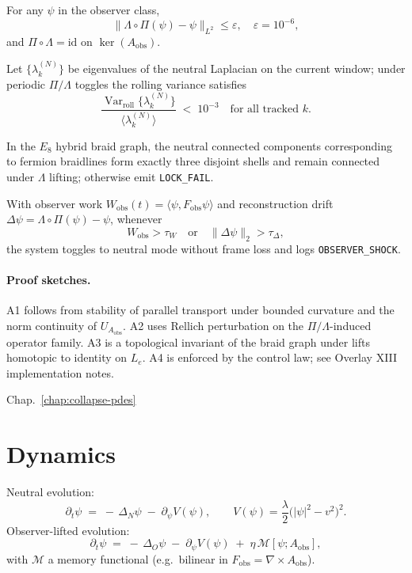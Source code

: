 \begin{prop}[A1: Idempotence]
For any $\psi$ in the observer class,
\[
\|\Lambda\!\circ\!\Pi(\psi)-\psi\|_{L^2}\le \varepsilon,\quad \varepsilon=10^{-6},
\]
and $\Pi\!\circ\!\Lambda=\mathrm{id}$ on $\ker(A_{\mathrm{obs}})$.
\end{prop}

\begin{prop}
Let $\{\lambda_k^{(N)}\}$ be eigenvalues of the neutral Laplacian on the current window; under periodic $\Pi/\Lambda$ toggles the rolling variance satisfies
\[
\frac{\operatorname{Var}_{\mathrm{roll}}\{\lambda_k^{(N)}\}}{\langle\lambda_k^{(N)}\rangle}\;<\;10^{-3}\quad \text{for all tracked }k.
\]
\end{prop}

\begin{prop}
In the $E_8$ hybrid braid graph, the neutral connected components corresponding to fermion braidlines form exactly three disjoint shells and remain connected under $\Lambda$ lifting; otherwise emit \texttt{LOCK\_FAIL}.
\end{prop}

\begin{prop}
With observer work $W_{\mathrm{obs}}(t)=\langle\psi, F_{\mathrm{obs}}\psi\rangle$ and reconstruction drift $\Delta\psi=\Lambda\!\circ\!\Pi(\psi)-\psi$, whenever
\[
W_{\mathrm{obs}}>\tau_W\quad\text{or}\quad \|\Delta\psi\|_2>\tau_\Delta,
\]
the system toggles to neutral mode without frame loss and logs \texttt{OBSERVER\_SHOCK}.
\end{prop}

\paragraph{Proof sketches.}
A1 follows from stability of parallel transport under bounded curvature and the norm continuity of $U_{A_{\mathrm{obs}}}$. A2 uses Rellich perturbation on the $\Pi/\Lambda$-induced operator family. A3 is a topological invariant of the braid graph under lifts homotopic to identity on $L_e$. A4 is enforced by the control law; see Overlay XIII implementation notes.

Chap.~\ref{chap:collapse-pdes}

\section{Dynamics}
Neutral evolution:
\begin{equation}
\partial_t \psi \;=\; -\,\Delta_N \psi \;-\; \partial_\psi V(\psi), \qquad
V(\psi)=\frac{\lambda}{2}\big(|\psi|^2-v^2\big)^2 .
\label{eq:neutral}
\end{equation}
Observer-lifted evolution:
\begin{equation}
\partial_t \psi \;=\; -\,\Delta_O \psi \;-\; \partial_\psi V(\psi) \;+\; \eta\,\mathcal{M}[\psi;A_{\mathrm{obs}}],
\label{eq:lifted-pde}
\end{equation}
with $\mathcal{M}$ a memory functional (e.g.\ bilinear in $F_{\mathrm{obs}}=\nabla\!\times A_{\mathrm{obs}}$).


